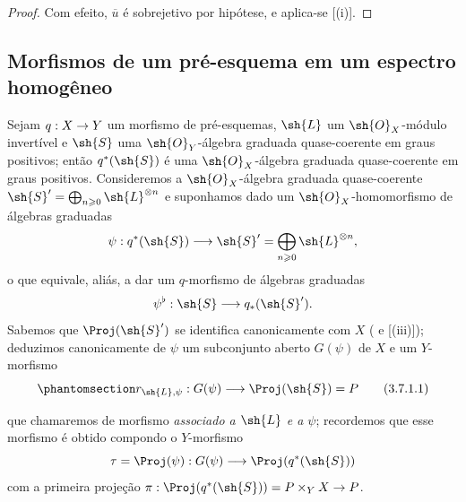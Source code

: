 \documentclass[oneside,10pt]{amsart}
\makeatletter
\renewcommand{\geq}{\geqslant}
\newcommand{\ega@arrow}[2]{\mathchoice{#1}{#2}{#2}{#2}}
\renewcommand{\to}{\ega@arrow{\longrightarrow}{\rightarrow}}
\newcommand{\oldpage}[2][]{\marginnote{\normalfont\footnotesize\textbf{#1}~|~#2}\ignorespaces}
\let\EGAOriginalLabel\label
\renewcommand{\label}[1]{\phantomsection\EGAOriginalLabel{#1}}
\makeatother
\begin{document}
\begin{proof}
Com efeito, $\overline{u}$ é sobrejetivo por hipótese, e aplica-se [(i)].
\end{proof}

\subsection{Morfismos de um pré-esquema em um espectro homogêneo}
\label{subsection:II.3.7}

\begin{env}[3.7.1]
\label{II.3.7.1}
Sejam $q:X\to Y$ um morfismo de pré-esquemas, $\sh{L}$ um $\sh{O}_X$-módulo invertível e $\sh{S}$ uma $\sh{O}_Y$-álgebra graduada quase-coerente em graus positivos;
então $q^*(\sh{S})$ é uma $\sh{O}_X$-álgebra graduada quase-coerente em graus positivos.
Consideremos a $\sh{O}_X$-álgebra graduada quase-coerente $\sh{S}'=\bigoplus_{n\geq0}\sh{L}^{\otimes n}$ e suponhamos dado um $\sh{O}_X$-homomorfismo de álgebras graduadas
\[
  \psi:q^*(\sh{S})\longrightarrow
  \sh{S}'=\bigoplus_{n\geq0}\sh{L}^{\otimes n},
\]
o que equivale, aliás, a dar um $q$-morfismo de álgebras graduadas
\[
  \psi^\flat:\sh{S}\longrightarrow q_*(\sh{S}').
\]
Sabemos que $\Proj(\sh{S}')$ se identifica canonicamente com $X$ ( e [(iii)]);
deduzimos canonicamente de $\psi$ um subconjunto aberto $G(\psi)$ de $X$ e um $Y$-morfismo
\[
\label{II.3.7.1.1}
  r_{\sh{L},\psi}:G(\psi)\longrightarrow \Proj(\sh{S})=P
\tag{3.7.1.1}
\]
\oldpage[II]{66}

que chamaremos de morfismo \emph{associado a $\sh{L}$ e a $\psi$};
recordemos  que esse morfismo é obtido compondo o $Y$-morfismo
\[
  \tau=\Proj(\psi):G(\psi)\longrightarrow\Proj(q^*(\sh{S}))
\]
com a primeira projeção $\pi:\Proj(q^*(\sh{S}))=P\times_YX\to P$.
\end{env}
\end{document}
